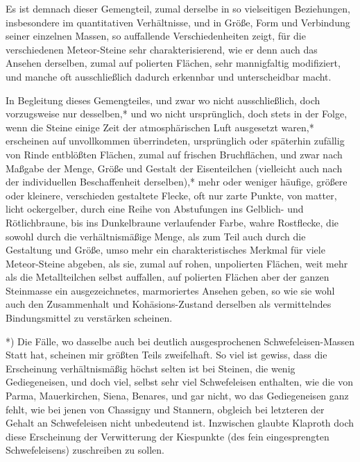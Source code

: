 \documentclass[a4paper, 11pt, oneside, german]{article}
\begin{document}
Es ist demnach dieser Gemengteil, zumal derselbe in so vielseitigen Beziehungen, insbesondere im quantitativen Verhältnisse, und in Größe, Form und Verbindung seiner einzelnen Massen, so auffallende Verschiedenheiten zeigt, für die verschiedenen Meteor-Steine sehr charakterisierend, wie er denn auch das Ansehen derselben, zumal auf polierten Flächen, sehr mannigfaltig modifiziert, und manche oft ausschließlich dadurch erkennbar und unterscheidbar macht.

In Begleitung dieses Gemengteiles, und zwar wo nicht ausschließlich, doch vorzugsweise nur desselben,* und wo nicht ursprünglich, doch stets in der Folge, wenn die Steine einige Zeit der atmosphärischen Luft ausgesetzt waren,* erscheinen auf unvollkommen überrindeten, ursprünglich oder späterhin zufällig von Rinde entblößten Flächen, zumal auf frischen Bruchflächen, und zwar nach Maßgabe der Menge, Größe und Gestalt der Eisenteilchen (vielleicht auch nach der individuellen Beschaffenheit derselben),* mehr oder weniger häufige, größere oder kleinere, verschieden gestaltete Flecke, oft nur zarte Punkte, von matter, licht ockergelber, durch eine Reihe von Abstufungen ins Gelblich- und Rötlichbraune, bis ins Dunkelbraune verlaufender Farbe, wahre Rostflecke, die sowohl durch die verhältnismäßige Menge, als zum Teil auch durch die Gestaltung und Größe, umso mehr ein charakteristisches Merkmal für viele Meteor-Steine abgeben, als sie, zumal auf rohen, unpolierten Flächen, weit mehr als die Metallteilchen selbst auffallen, auf polierten Flächen aber der ganzen Steinmasse ein ausgezeichnetes, marmoriertes Ansehen geben, so wie sie wohl auch den Zusammenhalt und Kohäsions-Zustand derselben als vermittelndes Bindungsmittel zu verstärken scheinen.

*) Die Fälle, wo dasselbe auch bei deutlich ausgesprochenen Schwefeleisen-Massen Statt hat, scheinen mir größten Teils zweifelhaft. So viel ist gewiss, dass die Erscheinung verhältnismäßig höchst selten ist bei Steinen, die wenig Gediegeneisen, und doch viel, selbst sehr viel Schwefeleisen enthalten, wie die von Parma, Mauerkirchen, Siena, Benares, und gar nicht, wo das Gediegeneisen ganz fehlt, wie bei jenen von Chassigny und Stannern, obgleich bei letzteren der Gehalt an Schwefeleisen nicht unbedeutend ist. Inzwischen glaubte Klaproth doch diese Erscheinung der Verwitterung der Kiespunkte (des fein eingesprengten Schwefeleisens) zuschreiben zu sollen.
\end{document}
